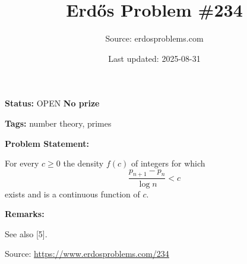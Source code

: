 \documentclass{article}
\title{Erd\H{o}s Problem \#234}
\date{Last updated: 2025-08-31}
\author{Source: erdosproblems.com}
\begin{document}
\maketitle

\noindent\textbf{Status:} OPEN \quad \textbf{No prize}

\noindent\textbf{Tags:} number theory, primes

\medskip
\noindent\textbf{Problem Statement:}

For every $c\geq 0$ the density $f(c)$ of integers for which\[\frac{p_{n+1}-p_n}{\log n}< c\]exists and is a continuous function of $c$.

\bigskip
\noindent\textbf{Remarks:}

See also [5].

\bigskip
\noindent\small{Source: \url{https://www.erdosproblems.com/234}}
\end{document}
